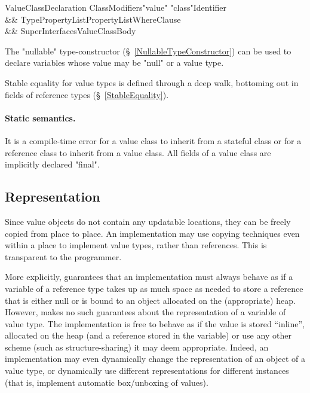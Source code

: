 \begin{grammar}
ValueClassDeclaration \:
      ClassModifiers\opt \xcd"value" \xcd"class"\opt Identifier  \\
   && TypePropertyList\opt PropertyList\opt WhereClause\opt \\
   && Super\opt Interfaces\opt ValueClassBody \\
\end{grammar}


The \xcd"nullable" type-constructor (\S~\ref{NullableTypeConstructor}) can
be used to declare variables whose value may be \xcd"null" or a value
type.

Stable equality for value types is defined through a deep walk,
bottoming out in fields of reference types (\S~\ref{StableEquality}).

\paragraph{Static semantics.}
It is a compile-time error for a value class to inherit from a
stateful class or for a reference class to inherit from a value
class. All fields of a value class are implicitly declared \xcd"final".

\subsection{Representation}

Since value objects do not contain any updatable locations, they can
be freely copied from place to place. An implementation may use
copying techniques even within a place to implement value types,
rather than references. This is transparent to the programmer.

More explicitly, \Xten{} guarantees that an implementation must always
behave as if a variable of a reference type takes up as much space as
needed to store a reference that is either null or is bound to an
object allocated on the (appropriate) heap. However, \Xten{} makes no
such guarantees about the representation of a variable of value
type. The implementation is free to behave as if the value is stored
``inline'', allocated on the heap (and a reference stored in the
variable) or use any other scheme (such as structure-sharing) it may
deem appropriate. Indeed, an implementation may even dynamically
change the representation of an object of a value type, or dynamically
use different representations for different instances (that is,
implement automatic box/unboxing of values).

